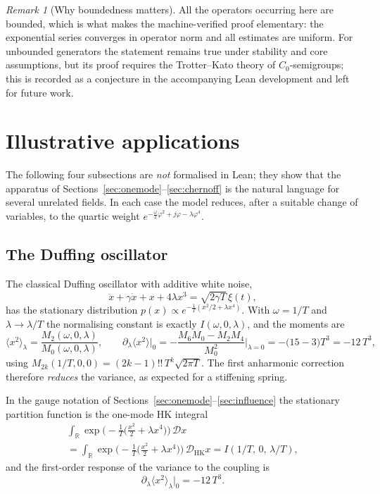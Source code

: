 \documentclass[11pt,a4paper]{article}
\theoremstyle{plain}
\theoremstyle{definition}
\theoremstyle{remark}
\newtheorem{remark}[theorem]{Remark}
\newcommand{\R}{\mathbb{R}}
\begin{document}
\begin{remark}[Why boundedness matters]
All the operators occurring here are bounded, which is what makes the machine-verified
proof elementary: the exponential series converges in operator norm and all estimates are
uniform. For unbounded generators the statement remains true under stability and core
assumptions, but its proof requires the Trotter--Kato theory of $C_0$-semigroups; this is
recorded as a conjecture in the accompanying Lean development and left for future work.
\end{remark}

\section{Illustrative applications}
\label{sec:applications}

The following four subsections are \emph{not} formalised in Lean; they show that the
apparatus of Sections~\ref{sec:onemode}--\ref{sec:chernoff} is the natural language for
several unrelated fields. In each case the model reduces, after a suitable change of
variables, to the quartic weight $e^{-\frac{\omega}{2}\varphi^{2}+j\varphi-\lambda\varphi^{4}}$.

\subsection{The Duffing oscillator}

The classical Duffing oscillator with additive white noise,
\[
\ddot x+\gamma\dot x+x+4\lambda x^{3}=\sqrt{2\gamma T}\,\xi(t),
\]
has the stationary distribution
$p(x)\propto e^{-\frac{1}{T}(x^{2}/2+\lambda x^{4})}$. With $\omega=1/T$ and
$\lambda\to\lambda/T$ the normalising constant is exactly $I(\omega,0,\lambda)$, and the
moments are
\[
\langle x^{2}\rangle_\lambda=\frac{M_2(\omega,0,\lambda)}{M_0(\omega,0,\lambda)},
\qquad
\partial_\lambda\langle x^{2}\rangle\big|_{0}
=-\frac{M_6M_0-M_2M_4}{M_0^{2}}\bigg|_{\lambda=0}
=-\big(15-3\big)T^{3}=-12\,T^{3},
\]
using $M_{2k}(1/T,0,0)=(2k-1)!!\,T^{k}\sqrt{2\pi T}$. The first anharmonic correction
therefore \emph{reduces} the variance, as expected for a stiffening spring.

In the gauge notation of Sections~\ref{sec:onemode}--\ref{sec:influence} the
stationary partition function is the one-mode HK integral
\begin{multline*}
\int_{\R} \exp\!\Big(-\frac{1}{T}\Big(\frac{x^{2}}{2}+\lambda x^{4}\Big)\Big)\,\mathcal{D}x\\
=\int_{\R} \exp\!\Big(-\frac{1}{T}\Big(\frac{x^{2}}{2}+\lambda x^{4}\Big)\Big)\,
   \mathcal{D}_{\mathrm{HK}}x
= I(1/T,\,0,\,\lambda/T),
\end{multline*}
and the first-order response of the variance to the coupling is
\[
\partial_\lambda\langle x^{2}\rangle_\lambda\big|_{0}=-12\,T^{3}.
\]
\end{document}
